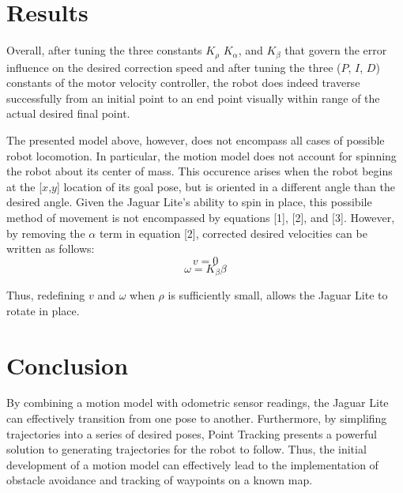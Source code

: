 \documentclass[conference]{IEEEtran}
\begin{document}

\section{Results}

Overall, after tuning the three constants $K_{\rho}$ $K_{\alpha}$, and $K_{\beta}$ 
that govern the error influence on the desired correction speed and after tuning
the three ($P$, $I$, $D$) constants of the motor velocity controller, the robot does indeed 
traverse successfully from an initial point to an end point visually within range of the 
actual desired final point.  

The presented model above, however, does not encompass all cases of possible robot 
locomotion.  In particular, the motion model does not account for spinning the robot about
its center of mass.  This occurence arises when the robot begins at the [$x$,$y$] location 
of its goal pose, but is oriented in a different angle than the desired angle.  Given the 
Jaguar Lite's ability to spin in place, this possibile method of movement is not encompassed by equations
[1], [2], and [3].  
However, by removing the $\alpha$ term in equation [2], corrected desired velocities 
can be written as follows:
\begin{equation} 
v = 0
\end{equation}
\begin{equation}
\omega = K_{\beta} \beta 
\end{equation}

Thus, redefining $v$ and $\omega$ when $\rho$ is sufficiently small, allows the Jaguar Lite to rotate 
in place.


\section{Conclusion}
By combining a motion model with odometric sensor readings, the Jaguar 
Lite can effectively transition from one pose to another.
Furthermore, by simplifing trajectories into a series of desired poses,
Point Tracking presents a powerful solution to generating trajectories 
for the robot to follow.  Thus, the initial development of a motion model
can effectively lead to the implementation of obstacle avoidance and 
tracking of waypoints on a known map.
\end{document}
